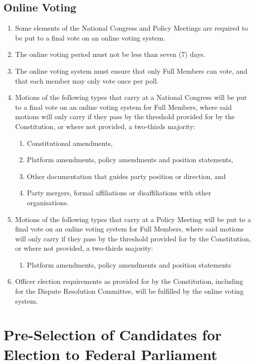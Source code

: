 \documentclass[a4paper,titlepage,8.5pt]{article}
\begin{document}
\subsection{Online Voting}

\begin{enumerate}
\item Some elements of the National Congress and Policy Meetings are required to be put to a final vote on an online voting system.
\item The online voting period must not be less than seven (7) days.
\item The online voting system must ensure that only Full Members can vote, and that each member may only vote once per poll.
\item Motions of the following types that carry at a National Congress will be put to a final vote on an online voting system for Full Members, where said motions will only carry if they pass by the threshold provided for by the Constitution, or where not provided, a two-thirds majority:
\begin{enumerate}
\item Constitutional amendments,
\item Platform amendments, policy amendments and position statements,
\item Other documentation that guides party position or direction, and
\item Party mergers, formal affiliations or disaffiliations with other organisations.
\end{enumerate}
\item Motions of the following types that carry at a Policy Meeting will be put to a final vote on an online voting system for Full Members, where said motions will only carry if they pass by the threshold provided for by the Constitution, or where not provided, a two-thirds majority:
\begin{enumerate}
\item Platform amendments, policy amendments and position statements
\end{enumerate}
\item Officer election requirements as provided for by the Constitution, including for the Dispute Resolution Committee, will be fulfilled by the online voting system.
\end{enumerate}

\section{Pre-Selection of Candidates for Election to Federal Parliament}
\end{document}

